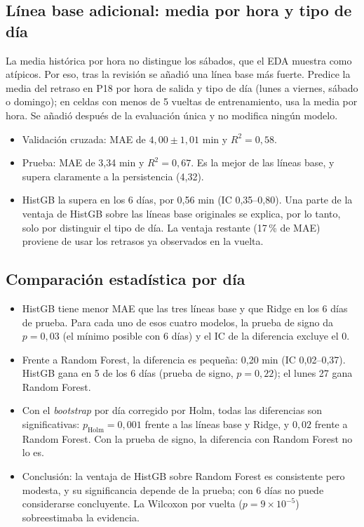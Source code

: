 \documentclass[conference,spanish]{IEEEtran}
\begin{document}
\subsection{Línea base adicional: media por hora y tipo de día}\label{sec:lb}
La media histórica por hora no distingue los sábados, que el EDA muestra como atípicos. Por eso, tras la revisión se añadió una línea base más fuerte. Predice la media del retraso en P18 por hora de salida y tipo de día (lunes a viernes, sábado o domingo); en celdas con menos de 5 vueltas de entrenamiento, usa la media por hora. Se añadió después de la evaluación única y no modifica ningún modelo.
\begin{itemize}
    \item Validación cruzada: MAE de $4{,}00\pm1{,}01$ min y $R^2=0{,}58$.
    \item Prueba: MAE de 3,34 min y $R^2=0{,}67$. Es la mejor de las líneas base, y supera claramente a la persistencia (4,32).
    \item HistGB la supera en los 6 días, por 0,56 min (IC 0,35--0,80). Una parte de la ventaja de HistGB sobre las líneas base originales se explica, por lo tanto, solo por distinguir el tipo de día. La ventaja restante (17\,\% de MAE) proviene de usar los retrasos ya observados en la vuelta.
\end{itemize}

\subsection{Comparación estadística por día}\label{sec:comparacion}
\begin{itemize}
    \item HistGB tiene menor MAE que las tres líneas base y que Ridge en los 6 días de prueba. Para cada uno de esos cuatro modelos, la prueba de signo da $p=0{,}03$ (el mínimo posible con 6 días) y el IC de la diferencia excluye el 0.
    \item Frente a Random Forest, la diferencia es pequeña: 0,20 min (IC 0,02--0,37). HistGB gana en 5 de los 6 días (prueba de signo, $p=0{,}22$); el lunes 27 gana Random Forest.
    \item Con el \textit{bootstrap} por día corregido por Holm, todas las diferencias son significativas: $p_{\text{Holm}}=0{,}001$ frente a las líneas base y Ridge, y $0{,}02$ frente a Random Forest. Con la prueba de signo, la diferencia con Random Forest no lo es.
    \item Conclusión: la ventaja de HistGB sobre Random Forest es consistente pero modesta, y su significancia depende de la prueba; con 6 días no puede considerarse concluyente. La Wilcoxon por vuelta ($p=9\times10^{-5}$) sobreestimaba la evidencia.
\end{itemize}
\end{document}
